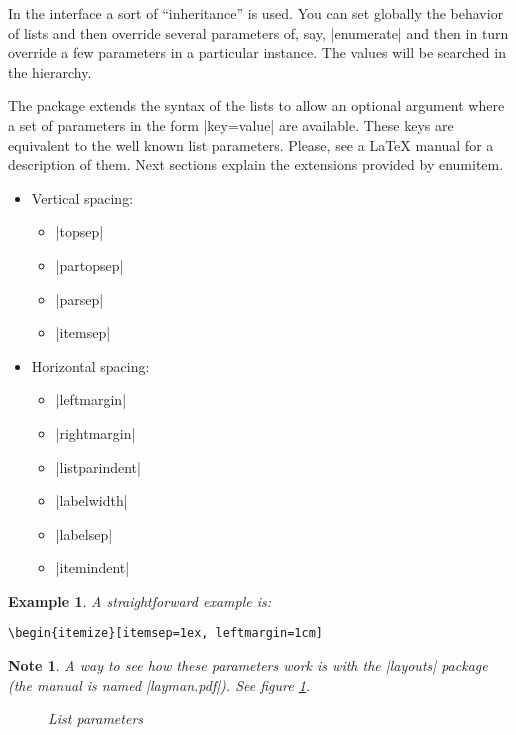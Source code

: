 \documentclass[a4paper]{ltxguide}
\newtheorem{note}{Note}
\newtheorem{example}{Example}
\begin{document}
In the interface a sort of ``inheritance'' is used. You can set
globally the behavior of lists and then override several parameters of,
say, |enumerate| and then in turn override a few parameters in a
particular instance. The values will be searched in the hierarchy.

The package extends the syntax of the lists to allow an optional
argument where a set of parameters in the form |key=value| are
available. These keys are equivalent to the well known list parameters.
Please, see a \LaTeX{} manual for a description of them. Next sections
explain the extensions provided by \textsf{enumitem}.
\begin{itemize}
\item
Vertical spacing:
\begin{itemize}
\setlength{\itemsep}{0pt}
\item |topsep|
\item |partopsep|
\item |parsep|
\item |itemsep|
\end{itemize}
\item
Horizontal spacing:
\begin{itemize}
\setlength{\itemsep}{0pt}
\item |leftmargin|
\item |rightmargin|
\item |listparindent|
\item |labelwidth|
\item |labelsep|
\item |itemindent|
\end{itemize}
\end{itemize}

\begin{example}
  A straightforward example is:
\begin{verbatim}
\begin{itemize}[itemsep=1ex, leftmargin=1cm]
\end{verbatim}
\end{example}

\begin{note}
  A way to see how these parameters work is with the |layouts| package
  (the manual is named |layman.pdf|).
  \ifx\listdiagram\notundefined\else
    See figure \ref{f.drawlist}.
    \begin{figure}
      \centering
      \listdiagram
      \caption{List parameters}\label{f.drawlist}
    \end{figure}
  \fi
\end{note}
\end{document}
